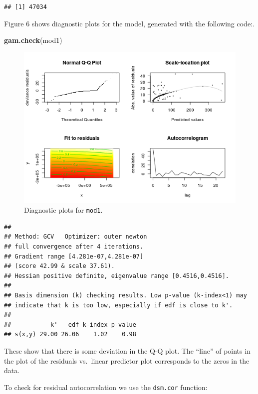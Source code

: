 \documentclass[]{amsart}
\makeatletter
\newenvironment{Shaded}{}{}
\newcommand{\KeywordTok}[1]{\textcolor[rgb]{0.00,0.44,0.13}{\textbf{{#1}}}}
\newcommand{\NormalTok}[1]{{#1}}
\def\maxwidth{\ifdim\Gin@nat@width>\linewidth\linewidth
\else\Gin@nat@width\fi}
\let\Oldincludegraphics\includegraphics
\renewcommand{\includegraphics}[1]{\Oldincludegraphics[width=\maxwidth]{#1}}
\makeatother
\begin{document}
\begin{verbatim}
## [1] 47034
\end{verbatim}

Figure 6 shows diagnostic plots for the model, generated with the
following code:.

\begin{Shaded}
\begin{Highlighting}[]
\KeywordTok{gam.check}\NormalTok{(mod1)}
\end{Highlighting}
\end{Shaded}

\begin{figure}[htbp]
\centering
\includegraphics{mexico-figs/mod1-check.png}
\caption{Diagnostic plots for \texttt{mod1}.}
\end{figure}

\begin{verbatim}
## 
## Method: GCV   Optimizer: outer newton
## full convergence after 4 iterations.
## Gradient range [4.281e-07,4.281e-07]
## (score 42.99 & scale 37.61).
## Hessian positive definite, eigenvalue range [0.4516,0.4516].
## 
## Basis dimension (k) checking results. Low p-value (k-index<1) may
## indicate that k is too low, especially if edf is close to k'.
## 
##           k'   edf k-index p-value
## s(x,y) 29.00 26.06    1.02    0.98
\end{verbatim}

These show that there is some deviation in the Q-Q plot. The ``line'' of
points in the plot of the residuals vs.~linear predictor plot
corresponds to the zeros in the data.

To check for residual autocorrelation we use the \texttt{dsm.cor}
function:
\end{document}
